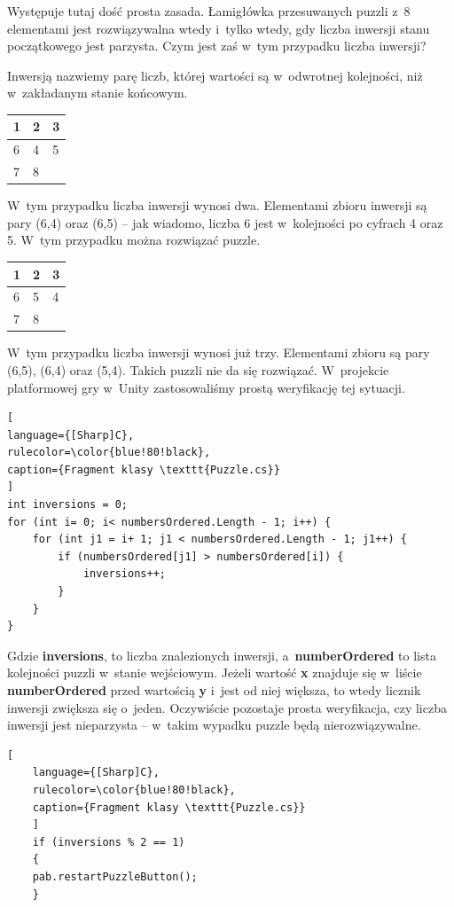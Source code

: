 \documentclass[oneside,polski,logo]{amuthesis}
\begin{document}
Występuje tutaj dość prosta zasada. Łamigłówka przesuwanych puzzli z~8 elementami jest rozwiązywalna wtedy i~tylko wtedy, gdy liczba inwersji stanu początkowego jest parzysta. Czym jest zaś w~tym przypadku liczba inwersji?

Inwersją nazwiemy parę liczb, której wartości są w~odwrotnej kolejności, niż w~zakładanym stanie końcowym. \cite{solvablePuzzle}

\begin{center}
\begin{tabular}{ | m{5em} | m{1cm}| m{1cm} | } 
\hline
 1 & 2 & 3 \\ 
\hline
 6 & 4 & 5 \\
\hline  
 7 & 8 &     \\
\hline
\end{tabular}
\end{center}

W~tym przypadku liczba inwersji wynosi dwa. Elementami zbioru inwersji są pary (6,4) oraz (6,5) – jak wiadomo, liczba 6 jest w~kolejności po cyfrach 4 oraz 5. W~tym przypadku można rozwiązać puzzle.

\begin{center}
\begin{tabular}{ | m{5em} | m{1cm}| m{1cm} | } 
\hline
 1 & 2 & 3 \\ 
\hline
 6 & 5 & 4 \\  
\hline
 7 & 8 &     \\
\hline
\end{tabular}
\end{center}

W~tym przypadku liczba inwersji wynosi już trzy. Elementami zbioru są pary (6,5), (6,4) oraz (5,4). Takich puzzli nie da się rozwiązać. 
W~projekcie platformowej gry w~Unity zastosowaliśmy prostą weryfikację tej sytuacji. 
\\
\begin{lstlisting}[
language={[Sharp]C},
rulecolor=\color{blue!80!black},
caption={Fragment klasy \texttt{Puzzle.cs}}
]
int inversions = 0;
for (int i= 0; i< numbersOrdered.Length - 1; i++) {
    for (int j1 = i+ 1; j1 < numbersOrdered.Length - 1; j1++) {
        if (numbersOrdered[j1] > numbersOrdered[i]) {
            inversions++;
        }
    }
}

\end{lstlisting}
\par Gdzie \textbf{inversions}, to liczba znalezionych inwersji, a~\textbf{numberOrdered} to lista kolejności puzzli w~stanie wejściowym. Jeżeli wartość \textbf{x} znajduje się w~liście \textbf{numberOrdered} przed wartością \textbf{y} i~jest od niej większa, to wtedy licznik inwersji zwiększa się o~jeden.
Oczywiście pozostaje prosta weryfikacja, czy liczba inwersji jest nieparzysta – w~takim wypadku puzzle będą nierozwiązywalne.
\begin{lstlisting}[
	language={[Sharp]C},
	rulecolor=\color{blue!80!black},
	caption={Fragment klasy \texttt{Puzzle.cs}}
	]
	if (inversions % 2 == 1)
	{
	pab.restartPuzzleButton();
	}
\end{lstlisting}
\end{document}

